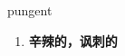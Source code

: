 
\begin{frame}
{\huge pungent}
\begin{center}
\begin{enumerate}\Large
  \item \textbf{辛辣的，讽刺的}
\end{enumerate}
\end{center}
\end{frame}
